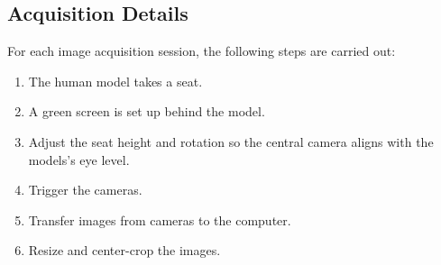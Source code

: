 


\subsection{Acquisition Details}
\label{sec:acquisition}

For each image acquisition session, the following steps are carried out:
\begin{enumerate}[noitemsep]
	\item The human model takes a seat.
	\item A green screen is set up behind the model.
	\item Adjust the seat height and rotation so the central camera aligns with the models's eye level.
	\item Trigger the cameras.
	\item Transfer images from cameras to the computer.
	\item Resize and center-crop the images.
\end{enumerate}


